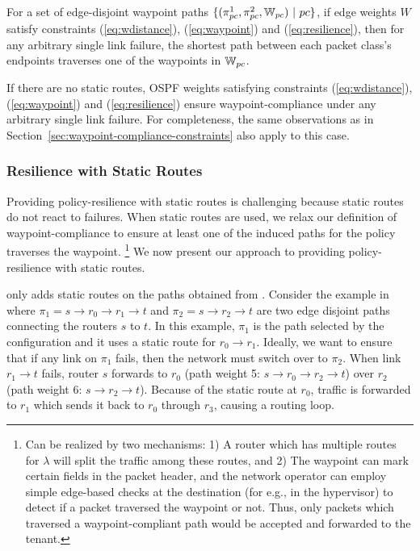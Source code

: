 \iffull
\begin{theorem}
	For a set of edge-disjoint waypoint paths $\{(\pi^1_{pc}, \pi^2_{pc}, \mathbb{W}_{pc}) ~|~ pc\}$, 
	if edge weights $W$ satisfy constraints (\ref{eq:wdistance}), (\ref{eq:waypoint}) and
	(\ref{eq:resilience}), 
	then for any arbitrary single link failure, 
	the shortest path between each packet class's 
	endpoints traverses one of the waypoints in $\mathbb{W}_{pc}$.
\end{theorem}

\fi

If there are no static routes, OSPF weights satisfying constraints 
(\ref{eq:wdistance}), (\ref{eq:waypoint}) and (\ref{eq:resilience}) ensure
waypoint-compliance under any arbitrary single link failure. For completeness, 
the same observations as in Section~\ref{sec:waypoint-compliance-constraints}
also apply to this case.  


\subsubsection{Resilience with Static Routes} \label{sec:ospfwressr} \hspace*{4mm}


Providing policy-resilience with static routes is challenging
because static routes do not react to failures. When static routes
are used, we relax our definition of waypoint-compliance to 
ensure at least one of the induced paths for the policy traverses the waypoint.
\footnote{
Can be realized by two mechanisms: 1) A router
which has multiple routes for $\lambda$ will split the traffic
among these routes, and 2) The waypoint can mark certain fields in
the packet header, and the network operator can employ 
simple edge-based checks at the destination 
(for e.g., in the hypervisor) to 
detect if a packet traversed the waypoint or not. Thus, only
packets which traversed a waypoint-compliant path would be 
accepted and forwarded to the tenant. 
} We now present our approach to providing policy-resilience with
static routes. 

\name only adds static routes on the paths obtained from \genesis.
Consider the example in  where 
$\pi_1=s\rightarrow r_0 \rightarrow r_1 \rightarrow t$ 
and $\pi_2=s\rightarrow r_2 \rightarrow t$ 
are two edge disjoint paths 
connecting the routers $s$ to $t$. In this example, 
$\pi_1$ is the path selected by the configuration and it uses a static route
for $r_0 \rightarrow r_1$. 
Ideally, we want to ensure 
that if any link on $\pi_1$ fails, 
then the network must switch over to $\pi_2$. 
When link $r_1 \rightarrow t$ fails,
router $s$ forwards to $r_0$ (path weight 5: $ s \rightarrow r_0 \rightarrow r_2 \rightarrow t$)
over $r_2$ (path weight 6: $s \rightarrow r_2 \rightarrow t$). 
Because of the static route at $r_0$, traffic is forwarded
to $r_1$ which sends it back to $r_0$ through $r_3$, 
causing a routing loop. 

